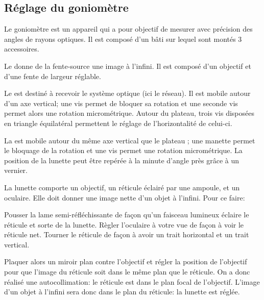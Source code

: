 \subsection{Réglage du goniomètre}
Le goniomètre est un appareil qui a pour objectif de mesurer avec précision des angles de rayons optiques. Il est composé d'un bâti sur lequel sont montés 3 accessoires.
\begin{liste}
  \item
   Le  donne de la fente-source une image à l'infini. Il est composé d'un objectif et d'une fente de largeur réglable.
  \item Le  est destiné à recevoir le système optique (ici le réseau). Il est mobile autour d'un axe vertical; une vis permet de bloquer sa rotation et une seconde vis permet alors une rotation micrométrique. Autour du plateau, trois vis disposées en triangle équilatéral permettent le réglage de l'horizontalité de celui-ci.
  \item  La  est mobile autour du même axe vertical que le plateau ; une manette permet le bloquage de la rotation et une vis permet une rotation micrométrique. La position de la lunette peut être repérée à la minute d'angle près grâce à un vernier.
\end{liste}

La lunette comporte un objectif, un réticule éclairé par une ampoule, et un oculaire. Elle doit donner une image nette d'un objet à l'infini. Pour ce faire:
\begin{protocole}
  \item 
  Pousser la lame semi-réfléchissante de façon qu'un faisceau lumineux éclaire le réticule et sorte de la lunette. Règler l'oculaire à votre vue de façon à voir le réticule net. Tourner le réticule de façon à avoir un trait horizontal et un trait vertical.
  
  \item Plaquer alors un miroir plan contre l'objectif et régler la position de l'objectif pour que l'image du réticule soit dans le même plan que le réticule. On a donc réalisé une autocollimation: le réticule est dans le plan focal de l'objectif. L'image d'un objet à l'infini sera donc dans le plan du réticule: la lunette est réglée.
\end{protocole}

